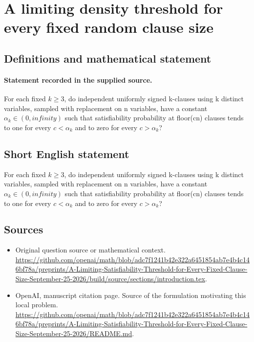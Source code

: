 \documentclass[11pt]{article}
\begin{document}
\section*{A limiting density threshold for every fixed random clause size}\label{30007383}
\subsection{Definitions and mathematical statement}
\paragraph{Statement recorded in the supplied source.}
For each fixed $k\geq 3$, do independent uniformly signed k-clauses using k distinct variables, sampled with replacement on n variables, have a constant $\alpha _k\in (0,infinity)$ such that satisfiability probability at floor(cn) clauses tends to one for every $c<\alpha _k$ and to zero for every $c>\alpha _k$?
\subsection{Short English statement}
For each fixed $k\geq 3$, do independent uniformly signed k-clauses using k distinct variables, sampled with replacement on n variables, have a constant $\alpha _k\in (0,infinity)$ such that satisfiability probability at floor(cn) clauses tends to one for every $c<\alpha _k$ and to zero for every $c>\alpha _k$?
\subsection{Sources}
\begin{itemize}
\item[S1] Original question source or mathematical context.
\url{https://github.com/openai/math/blob/adc7f1241b42e322a6451854ab7e4b4c146bf78a/preprints/A-Limiting-Satisfiability-Threshold-for-Every-Fixed-Clause-Size-September-25-2026/build/source/sections/introduction.tex}.
\item[S2] OpenAI, manuscript citation page. Source of the formulation motivating this local problem.
\url{https://github.com/openai/math/blob/adc7f1241b42e322a6451854ab7e4b4c146bf78a/preprints/A-Limiting-Satisfiability-Threshold-for-Every-Fixed-Clause-Size-September-25-2026/README.md}.
\end{itemize}
\end{document}
